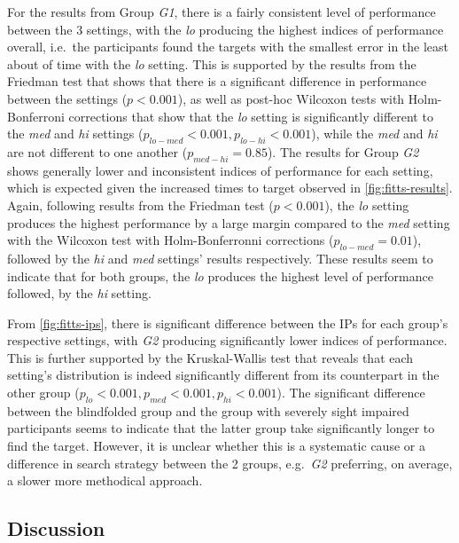 \documentclass{article}
\begin{document}
For the results from Group \textit{G1}, there is a fairly consistent level of performance between the 3 settings, with the \textit{lo} producing the highest indices of performance overall, i.e.\ the participants found the targets with the smallest error in the least about of time with the \textit{lo} setting.
This is supported by the results from the Friedman test that shows that there is a significant difference in performance between the settings ($p < 0.001$), as well as post-hoc Wilcoxon tests with Holm-Bonferroni corrections that show that the \textit{lo} setting is significantly different to the \textit{med} and \textit{hi} settings ($p_{lo-med} < 0.001, p_{lo-hi} < 0.001$), while the \textit{med} and \textit{hi} are not different to one another ($p_{med-hi} = 0.85$).
The results for Group \textit{G2} shows generally lower and inconsistent indices of performance for each setting, which is expected given the increased times to target observed in \cref{fig:fitts-results}.
Again, following results from the Friedman test ($p < 0.001$), the \textit{lo} setting produces the highest performance by a large margin compared to the \textit{med} setting with the Wilcoxon test with Holm-Bonferronni corrections ($p_{lo-med}=0.01$), followed by the \textit{hi} and \textit{med} settings' results respectively.
These results seem to indicate that for both groups, the \textit{lo} produces the highest level of performance followed, by the \textit{hi} setting.

From \cref{fig:fitts-ips}, there is significant difference between the IPs for each group's respective settings, with \textit{G2} producing significantly lower indices of performance.
This is further supported by the Kruskal-Wallis test that reveals that each setting's distribution is indeed significantly different from its counterpart in the other group ($p_{lo} < 0.001, p_{med} < 0.001, p_{hi} < 0.001$).
The significant difference between the blindfolded group and the group with severely sight impaired participants seems to indicate that the latter group take significantly longer to find the target. 
However, it is unclear whether this is a systematic cause or a difference in search strategy between the 2 groups, e.g.\ \textit{G2} preferring, on average, a slower more methodical approach.

\subsection{Discussion}
\end{document}

